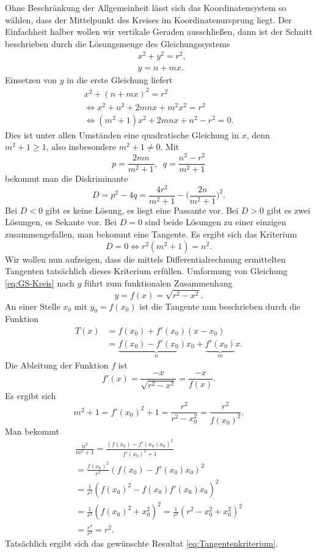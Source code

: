 Ohne Beschränkung der Allgemeinheit lässt sich das Koordinatensystem
so wählen, dass der Mittelpunkt des Kreises im Koordinatenursprung
liegt. Der Einfachheit halber wollen wir vertikale Geraden
ausschließen, dann ist der Schnitt beschrieben durch die Lösungsmenge
des Gleichungssystems%
\begin{align}\label{eq:GS-Kreis}
& x^2 + y^2 = r^2,\\
& y = n+mx.
\end{align}
Einsetzen von $y$ in die erste Gleichung liefert%
\begin{gather*}
x^2+(n+mx)^2 = r^2\\
\iff x^2+n^2+2mnx+m^2 x^2 = r^2\\
\iff (m^2+1)x^2 + 2mnx + n^2-r^2 = 0.
\end{gather*}
Dies ist unter allen Umständen eine quadratische Gleichung in $x$,
denn $m^2+1\ge 1$, also insbesondere $m^2+1\ne 0$. Mit%
\[p = \frac{2mn}{m^2+1},\;\; q = \frac{n^2-r^2}{m^2+1}\]
bekommt man die Diskriminante
\[D = p^2-4q = \frac{4r^2}{m^2+1}-\Big(\frac{2n}{m^2+1}\Big)^2.\]
Bei $D<0$ gibt es keine Lösung, es liegt eine Passante vor. Bei
$D>0$ gibt es zwei Lösungen, es Sekante vor. Bei $D=0$ sind beide
Lösungen zu einer einzigen zusammengefallen, man bekommt eine
Tangente. Es ergibt sich das Kriterium%
\begin{equation}\label{eq:Tangentenkriterium}
D=0\iff r^2(m^2+1)=n^2.
\end{equation}
Wir wollen nun aufzeigen, dass die mittels Differentialrechnung
ermittelten Tangenten tatsächlich dieses Kriterium erfüllen.
Umformung von Gleichung \eqref{eq:GS-Kreis} nach $y$ führt zum
funktionalen Zusammenhang%
\[y = f(x) = \sqrt{r^2-x^2}.\]
An einer Stelle $x_0$ mit $y_0=f(x_0)$ ist die Tangente nun
beschrieben durch die Funktion%
\begin{align*}
T(x) &= f(x_0)+f'(x_0)(x-x_0)\\
&= \underbrace{f(x_0)-f'(x_0)x_0}_{n}+\underbrace{f'(x_0)}_{m}x.
\end{align*}
Die Ableitung der Funktion $f$ ist%
\[f'(x) = \frac{-x}{\sqrt{r^2-x^2}} = \frac{-x}{f(x)}.\]
Es ergibt sich
\[m^2+1 = f'(x_0)^2+1 = \frac{r^2}{r^2-x_0^2} = \frac{r^2}{f(x_0)^2}.\]
Man bekommt
\begin{gather*}
\frac{n^2}{m^2+1}
= \frac{(f(x_0)-f'(x_0)x_0)^2}{f'(x_0)^2+1}\\
= \frac{f(x_0)^2}{r^2}(f(x_0)-f'(x_0)x_0)^2\\
= \frac{1}{r^2}(f(x_0)^2-f(x_0)f'(x_0)x_0)^2\\
= \frac{1}{r^2}(f(x_0)^2+x_0^2)^2
= \frac{1}{r^2}(r^2-x_0^2+x_0^2)^2\\
= \frac{r^4}{r^2} = r^2.
\end{gather*}
Tatsächlich ergibt sich das gewünschte Resultat
\eqref{eq:Tangentenkriterium}.

